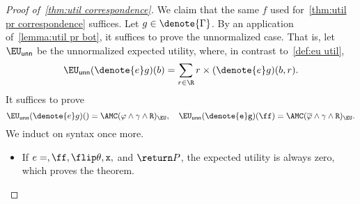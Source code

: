 \begin{proof}[Proof of~\cref{thm:util correspondence}]

  We claim that the same $f$ used for~\cref{thm:util pr correspondence} suffices. 
  Let $g \in \denote{\Gamma}$.
  By an application of~\cref{lemma:util pr bot}, it suffices to prove the unnormalized
  case. That is, let $\EU_{\mathsf{unn}}$ be the unnormalized expected utility, where,
  in contrast to~\cref{def:eu util},
  \begin{equation}
    \EU_{\mathsf{unn}}(\denote{e} g) (b)
      = \sum_{r \in \R} r \times (\denote{e}g)(b,r).
  \end{equation}
  It suffices to prove 
  \begin{equation}
    \EU_{\mathsf{unn}}(\denote{e} g)(\tt)
      = \AMC(\varphi \land \gamma \land R)_{\EU},
    \quad
    \EU_{\mathsf{unn}}(\denote{e} g)(\ff)
      = \AMC(\overline \varphi \land \gamma \land R)_{\EU}.    
  \end{equation}
  We induct on syntax once more.

  \begin{itemize}[leftmargin=*]
    \item If $e = \tt, \ff, \flip \theta, x,$ and $\return P$, 
    the expected utility is always zero,
    which proves the theorem.


\end{itemize}
\end{proof}
